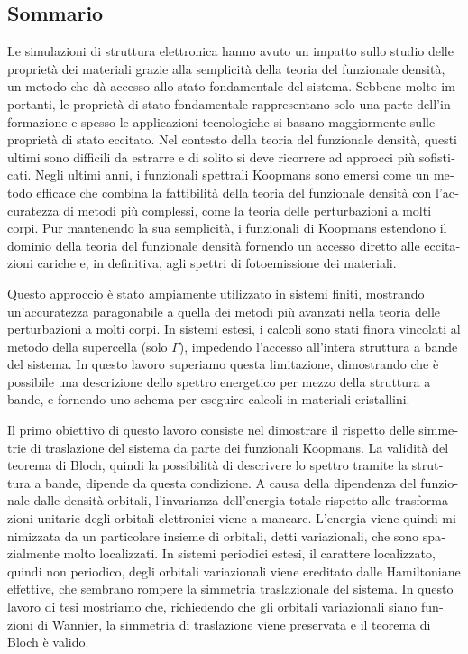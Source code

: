 \begin{otherlanguage}{italian}
\cleardoublepage
\chapter*{Sommario}
\vspace{2.4cm}
%

Le simulazioni di struttura elettronica hanno avuto un impatto sullo studio delle propriet\`{a} dei materiali grazie alla semplicit\`{a} della teoria del funzionale densit\`{a}, un metodo che d\`{a} accesso allo stato fondamentale del sistema. Sebbene molto importanti, le propriet\`{a} di stato fondamentale rappresentano solo una parte dell'informazione e spesso le applicazioni tecnologiche si basano maggiormente sulle propriet\`{a} di stato eccitato. Nel contesto della teoria del funzionale densit\`{a}, questi ultimi sono difficili da estrarre e di solito si deve ricorrere ad approcci più sofisticati. Negli ultimi anni, i funzionali spettrali Koopmans sono emersi come un metodo efficace che combina la fattibilit\`{a} della teoria del funzionale densit\`{a} con l'accuratezza di metodi più complessi, come la teoria delle perturbazioni a molti corpi. Pur mantenendo la sua semplicit\`{a}, i funzionali di Koopmans estendono il dominio della teoria del funzionale densit\`{a} fornendo un accesso diretto alle eccitazioni cariche e, in definitiva, agli spettri di fotoemissione dei materiali.

Questo approccio \`{e} stato ampiamente utilizzato in sistemi finiti, mostrando un'accuratezza paragonabile a quella dei metodi più avanzati nella teoria delle perturbazioni a molti corpi. In sistemi estesi, i calcoli sono stati finora vincolati al metodo della supercella (solo $\Gamma$), impedendo l'accesso all'intera struttura a bande del sistema. In questo lavoro superiamo questa limitazione, dimostrando che \`{e} possibile una descrizione dello spettro energetico  per mezzo della struttura a bande, e fornendo uno schema per eseguire calcoli in materiali cristallini.

Il primo obiettivo di questo lavoro consiste nel dimostrare il rispetto delle simmetrie di traslazione del sistema da parte dei funzionali Koopmans. La validit\`{a} del teorema di Bloch, quindi la possibilit\`{a} di descrivere lo spettro tramite la struttura a bande, dipende da questa condizione. A causa della dipendenza del funzionale dalle densit\`{a} orbitali, l'invarianza dell'energia totale rispetto alle trasformazioni unitarie degli orbitali elettronici viene a mancare. L'energia viene quindi minimizzata da un particolare insieme di orbitali, detti variazionali, che sono spazialmente molto localizzati. In sistemi periodici estesi, il carattere localizzato, quindi non periodico, degli orbitali variazionali viene ereditato dalle Hamiltoniane effettive, che sembrano rompere la simmetria traslazionale del sistema. In questo lavoro di tesi mostriamo che, richiedendo che gli orbitali variazionali siano funzioni di Wannier, la simmetria di traslazione viene preservata e il teorema di Bloch \`{e} valido.


\end{otherlanguage}
